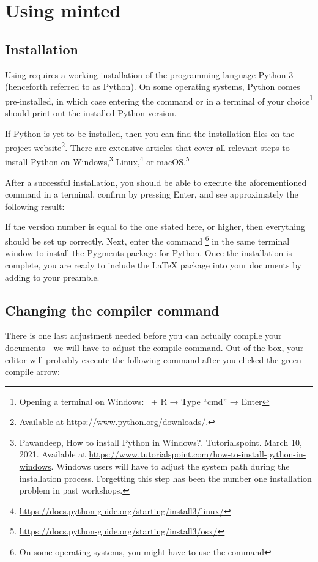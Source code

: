 \section{Using minted}

\subsection{Installation}
Using  requires a working installation of the programming language Python 3 (henceforth referred to as Python).
On some operating systems, Python comes pre-installed, in which case entering the command  or  in a terminal of your choice\footnote{Opening a terminal on Windows: \faWindows\ + R → Type \enquote{cmd} → Enter} should print out the installed Python version.

If Python is yet to be installed, then you can find the installation files on the project website\footnote{Available at \url{https://www.python.org/downloads/}.}.
There are extensive articles that cover all relevant steps to install Python on 
Windows,\footnote{Pawandeep, How to install Python in Windows?. Tutorialspoint. March 10, 2021. Available at 
\url{https://www.tutorialspoint.com/how-to-install-python-in-windows}. 
Windows users will have to adjust the system path during the installation process. Forgetting this step has 
been the number one installation problem in past workshops.} 
Linux,\footnote{\url{https://docs.python-guide.org/starting/install3/linux/}} 
or macOS.\footnote{\url{https://docs.python-guide.org/starting/install3/osx/}}

After a successful installation, you should be able to execute the aforementioned command in a terminal, confirm by pressing Enter, and see approximately the following result: 


\noindent If the version number is equal to the one stated here, or higher, then everything should be set up correctly.
Next, enter the command \footnote{On some operating systems, you might have to use the command } in the same terminal window to install the Pygments package for Python.
Once the installation is complete, you are ready to include the \LaTeX{} package  into your documents by adding  to your preamble.


\subsection{Changing the compiler command}
There is one last adjustment needed before you can actually compile your documents---we will have to adjust the compile command.
Out of the box, your editor will probably execute the following command after you clicked the green compile arrow:

